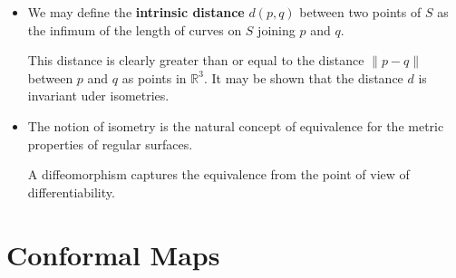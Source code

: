 \documentclass[10pt]{article}
\newcommand{\Real}{\mathbb{R}}
\begin{document}
\begin{itemize}
    \item We may define the {\bf intrinsic distance} $d(p,q)$ between two points of $S$ as the infimum of the length of curves on $S$ joining $p$ and $q$.

    This distance is clearly greater than or equal to the distance $\| p - q \|$ between $p$ and $q$ as points in $\Real^3$. It may be shown that the distance $d$ is invariant uder isometries.

    \item The notion of isometry is the natural concept of equivalence for the metric properties of regular surfaces.

    A diffeomorphism captures the equivalence from the point of view of differentiability.  
  \end{itemize}

  \section{Conformal Maps}
\end{document}
